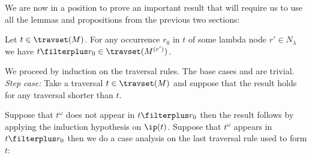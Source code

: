 We are now in a position to prove an important result that will require us to use all the lemmas and propositions from the previous two sections:
\begin{proposition}
    \label{prop:trav_projection}
    Let $t \in \travset(M)$. For any occurrence $r_0$ in $t$ of some lambda node
    $r'\in N_\lambda$ we have $t\filterplus r_0 \in \travset(M^{(r')})$.
\end{proposition}
\proof
    We proceed by induction on the traversal rules. The base cases  and
     are trivial. \emph{Step case:} Take a traversal $t \in \travset(M)$ and suppose that the result holds for any traversal shorter than $t$.

    Suppose that $t^\omega$ does not appear in $t \filterplus r_0$ then
    the result follows by applying the induction hypothesis on $\ip(t)$.
    Suppose that $t^\omega$ appears in $t \filterplus r_0$ then we do a case analysis on the last traversal rule used to form $t$:

